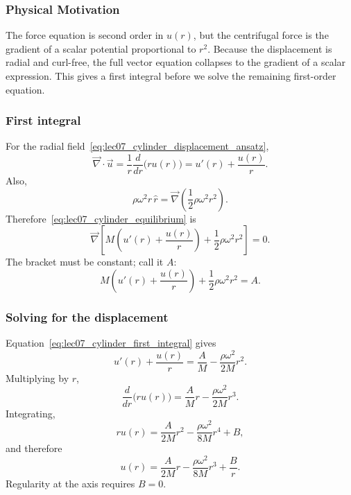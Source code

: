 \documentclass[../main.tex]{subfiles}
\begin{document}
\subsubsection*{Physical Motivation}
The force equation is second order in $u(r)$, but the centrifugal force is the gradient of a scalar potential proportional to $r^2$. Because the displacement is radial and curl-free, the full vector equation collapses to the gradient of a scalar expression. This gives a first integral before we solve the remaining first-order equation.

\subsubsection*{First integral}

For the radial field~\eqref{eq:lec07_cylinder_displacement_ansatz},
\begin{equation}
    \vec{\nabla}\cdot\vec{u}
    = \frac{1}{r}\frac{d}{dr}\bigl(r u(r)\bigr)
    = u'(r)+\frac{u(r)}{r}.
    \label{eq:lec07_cylinder_divergence}
\end{equation}
Also,
\[
    \rho\omega^2 r\,\hat{r}
    = \vec{\nabla}\left(\frac{1}{2}\rho\omega^2 r^2\right).
\]
Therefore~\eqref{eq:lec07_cylinder_equilibrium} is
\begin{equation}
    \vec{\nabla}\left[
        M\left(u'(r)+\frac{u(r)}{r}\right)
        +\frac{1}{2}\rho\omega^2 r^2
    \right]=0.
    \label{eq:lec07_cylinder_gradient_zero}
\end{equation}
The bracket must be constant; call it $A$:
\begin{equation}
    M\left(u'(r)+\frac{u(r)}{r}\right)
    +\frac{1}{2}\rho\omega^2 r^2
    = A.
    \label{eq:lec07_cylinder_first_integral}
\end{equation}

\subsubsection*{Solving for the displacement}

Equation~\eqref{eq:lec07_cylinder_first_integral} gives
\[
    u'(r)+\frac{u(r)}{r}
    = \frac{A}{M}-\frac{\rho\omega^2}{2M}r^2.
\]
Multiplying by $r$,
\[
    \frac{d}{dr}\bigl(r u(r)\bigr)
    = \frac{A}{M}r-\frac{\rho\omega^2}{2M}r^3.
\]
Integrating,
\begin{equation}
    r u(r)
    = \frac{A}{2M}r^2
      -\frac{\rho\omega^2}{8M}r^4+B,
    \label{eq:lec07_cylinder_integrated_ru}
\end{equation}
and therefore
\begin{equation}
    u(r)
    = \frac{A}{2M}r
      -\frac{\rho\omega^2}{8M}r^3
      +\frac{B}{r}.
    \label{eq:lec07_cylinder_general_u}
\end{equation}
Regularity at the axis requires $B=0$.
\end{document}

